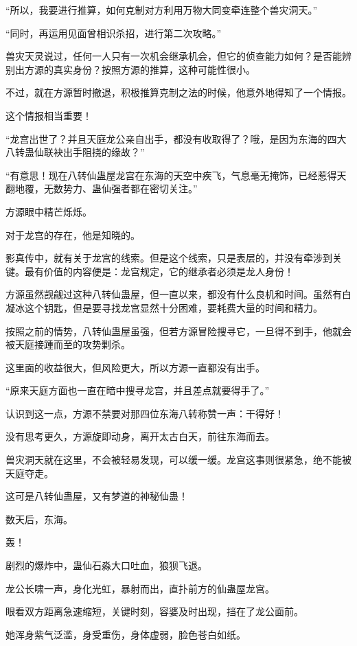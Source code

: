\begin{this_body}
“所以，我要进行推算，如何克制对方利用万物大同变牵连整个兽灾洞天。”

“同时，再运用见面曾相识杀招，进行第二次攻略。”

兽灾天灵说过，任何一人只有一次机会继承机会，但它的侦查能力如何？是否能辨别出方源的真实身份？按照方源的推算，这种可能性很小。

不过，就在方源暂时撤退，积极推算克制之法的时候，他意外地得知了一个情报。

这个情报相当重要！

“龙宫出世了？并且天庭龙公亲自出手，都没有收取得了？哦，是因为东海的四大八转蛊仙联袂出手阻挠的缘故？”

“有意思！现在八转仙蛊屋龙宫在东海的天空中疾飞，气息毫无掩饰，已经惹得天翻地覆，无数势力、蛊仙强者都在密切关注。”

方源眼中精芒烁烁。

对于龙宫的存在，他是知晓的。

影真传中，就有关于龙宫的线索。但是这个线索，只是表层的，并没有牵涉到关键。最有价值的内容便是：龙宫规定，它的继承者必须是龙人身份！

方源虽然觊觎过这种八转仙蛊屋，但一直以来，都没有什么良机和时间。虽然有白凝冰这个钥匙，但是要寻找龙宫显然十分困难，要耗费大量的时间和精力。

按照之前的情势，八转仙蛊屋虽强，但若方源冒险搜寻它，一旦得不到手，他就会被天庭接踵而至的攻势剿杀。

这里面的收益很大，但风险更大，所以方源一直都没有出手。

“原来天庭方面也一直在暗中搜寻龙宫，并且差点就要得手了。”

认识到这一点，方源不禁要对那四位东海八转称赞一声：干得好！

没有思考更久，方源旋即动身，离开太古白天，前往东海而去。

兽灾洞天就在这里，不会被轻易发现，可以缓一缓。龙宫这事则很紧急，绝不能被天庭夺走。

这可是八转仙蛊屋，又有梦道的神秘仙蛊！

数天后，东海。

轰！

剧烈的爆炸中，蛊仙石淼大口吐血，狼狈飞退。

龙公长啸一声，身化光虹，暴射而出，直扑前方的仙蛊屋龙宫。

眼看双方距离急速缩短，关键时刻，容婆及时出现，挡在了龙公面前。

她浑身紫气泛滥，身受重伤，身体虚弱，脸色苍白如纸。


\end{this_body}

